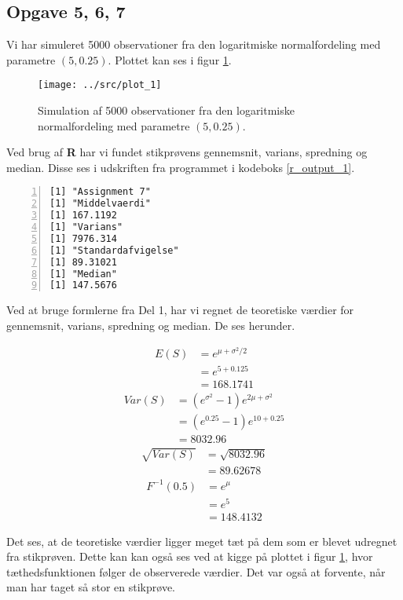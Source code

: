 \subsection*{Opgave 5, 6, 7}
Vi har simuleret 5000 observationer fra den logaritmiske
normalfordeling med parametre $(5, 0.25)$. Plottet kan ses i figur \ref{log_plot_1}.
\begin{figure}[!h]
    \centering
    \texttt{[image: ../src/plot\_1]}
    \caption{Simulation af 5000 observationer fra den logaritmiske
    normalfordeling med parametre $(5, 0.25)$.}
    \label{log_plot_1}
\end{figure}

Ved brug af \textbf{R} har vi fundet stikprøvens gennemsnit, varians, spredning
og median. Disse ses i udskriften fra programmet i kodeboks \ref{r_output_1}.

\begin{lstlisting}[caption={Udskrift fra R-program},captionpos=b,label={r_output_1},numbers=left,
    frame=tb, breaklines=false, float=h]
[1] "Assignment 7"
[1] "Middelvaerdi"
[1] 167.1192
[1] "Varians"
[1] 7976.314
[1] "Standardafvigelse"
[1] 89.31021
[1] "Median"
[1] 147.5676
\end{lstlisting}

Ved at bruge formlerne fra Del 1, har vi regnet de teoretiske værdier for
gennemsnit, varians, spredning og median. De ses herunder.

\begin{align}
    E(S) & = e^{\mu+\sigma^{2}/2}\nonumber\\
         & = e^{5+0.125}\nonumber\\
         & = 168.1741
\end{align}
\begin{align}
    Var(S) & = (e^{\sigma^{2}} - 1)e^{2\mu+\sigma^2}\nonumber\\
    & = (e^{0.25} - 1)e^{10+0.25}\nonumber\\
    & = 8032.96
\end{align}
\begin{align}
    \sqrt{Var(S)} & = \sqrt{8032.96}\nonumber\\
    & = 89.62678
\end{align}
\begin{align}
    F^{-1}(0.5) & = e^{\mu}\nonumber\\
    & = e^{5}\nonumber\\
    & = 148.4132
\end{align}

Det ses, at de teoretiske værdier ligger meget tæt på dem som er blevet
udregnet fra stikprøven. Dette kan kan også ses ved at kigge på plottet i figur
\ref{log_plot_1}, hvor tæthedsfunktionen følger de observerede værdier.  Det
var også at forvente, når man har taget så stor en stikprøve.
